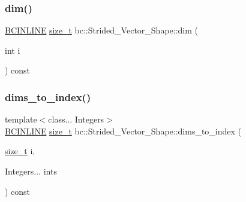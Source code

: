 \mbox{\label{structbc_1_1Strided__Vector__Shape_a41c14bb6b38e3f5f4f9d635d87196602}} 
\subsubsection{\texorpdfstring{dim()}{dim()}}
{\footnotesize\ttfamily \hyperlink{common_8h_a6699e8b0449da5c0fafb878e59c1d4b1}{B\+C\+I\+N\+L\+I\+NE} \hyperlink{namespacebc_aaf8e3fbf99b04b1b57c4f80c6f55d3c5}{size\+\_\+t} bc\+::\+Strided\+\_\+\+Vector\+\_\+\+Shape\+::dim (\begin{DoxyParamCaption}\item[{int}]{i }\end{DoxyParamCaption}) const\hspace{0.3cm}{\ttfamily [inline]}}

\mbox{\label{structbc_1_1Strided__Vector__Shape_ab9c66e9a077e7d3d4e9d49b6f526c504}} 
\subsubsection{\texorpdfstring{dims\+\_\+to\+\_\+index()}{dims\_to\_index()}\hspace{0.1cm}{\footnotesize\ttfamily [1/2]}}
{\footnotesize\ttfamily template$<$class... Integers$>$ \\
\hyperlink{common_8h_a6699e8b0449da5c0fafb878e59c1d4b1}{B\+C\+I\+N\+L\+I\+NE} \hyperlink{namespacebc_aaf8e3fbf99b04b1b57c4f80c6f55d3c5}{size\+\_\+t} bc\+::\+Strided\+\_\+\+Vector\+\_\+\+Shape\+::dims\+\_\+to\+\_\+index (\begin{DoxyParamCaption}\item[{\hyperlink{namespacebc_aaf8e3fbf99b04b1b57c4f80c6f55d3c5}{size\+\_\+t}}]{i,  }\item[{Integers...}]{ints }\end{DoxyParamCaption}) const\hspace{0.3cm}{\ttfamily [inline]}}

